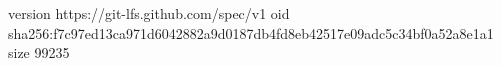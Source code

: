 version https://git-lfs.github.com/spec/v1
oid sha256:f7c97ed13ca971d6042882a9d0187db4fd8eb42517e09adc5c34bf0a52a8e1a1
size 99235
